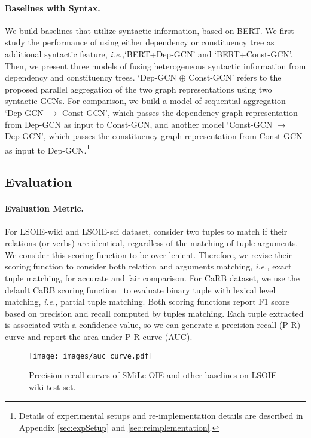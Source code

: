\documentclass[11pt]{article}
\newcommand{\ie}{\emph{i.e.,}\xspace}
\newcommand{\mname}{SMiLe-OIE\xspace}
\newcommand{\jj}[1]{{\textcolor{red}{#1}}}
\begin{document}
\paragraph{Baselines with Syntax.}
We build baselines that utilize syntactic information, based on BERT. We first study the performance of using either dependency or constituency tree as additional syntactic feature, \ie `BERT+Dep-GCN' and `BERT+Const-GCN'. Then, we present three models of fusing heterogeneous syntactic information from dependency and constituency trees. `Dep-GCN $\oplus$ Const-GCN' refers to the proposed parallel aggregation of the two graph representations using two syntactic GCNs. For comparison, we build a model of sequential aggregation `Dep-GCN $\rightarrow$ Const-GCN', which passes the dependency graph representation from Dep-GCN as input to Const-GCN, and another model `Const-GCN $\rightarrow$ Dep-GCN', which passes the constituency graph representation from Const-GCN as input to Dep-GCN.\footnote{Details of experimental setups and re-implementation details are described in Appendix \ref{sec:expSetup} and \ref{sec:reimplementation}.}


\subsection{Evaluation}

\paragraph{Evaluation Metric.}

For LSOIE-wiki and LSOIE-sci dataset, \citet{solawetz-larson-2021-lsoie} consider two tuples to match if their relations (or verbs) are identical, regardless of the matching of tuple arguments. We consider this scoring function to be over-lenient. Therefore, we revise their scoring function to consider both relation and arguments matching, \ie exact tuple matching, for accurate and fair comparison.
For CaRB dataset, we use the default CaRB scoring function~\cite{bhardwaj2019carb} to evaluate binary tuple with lexical level matching, \ie partial tuple matching.
Both scoring functions report F1 score based on precision and recall computed by tuples matching. Each tuple extracted is associated with a confidence value, so we can generate a precision-recall (P-R) curve and report the area under P-R curve (AUC).

\begin{figure}[t]
  \centering
  \texttt{[image: images/auc\_curve.pdf]}
  \vspace{-2.0em}
  \caption{Precision\jj{-}recall curves of \mname and other baselines on LSOIE-wiki test set.}
  \label{fig:auc}
\end{figure}
\end{document}
